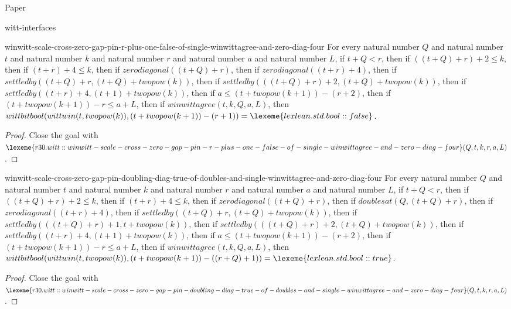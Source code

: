 \begin{lexlean}{Paper}
\begin{section}{witt-interfaces}
  \begin{theorem}{winwitt-scale-cross-zero-gap-pin-r-plus-one-false-of-single-winwittagree-and-zero-diag-four}
  For every natural number \(Q\) and natural number \(t\) and natural number \(k\) and natural number \(r\) and natural number \(a\) and natural number \(L\), if \(t + Q < r\), then if \(((t + Q) + r) + 2 ≤ k\), then if \((t + r) + 4 ≤ k\), then if \(zerodiagonal((t + Q) + r)\), then if \(zerodiagonal((t + r) + 4)\), then if \(settledby((t + Q) + r, (t + Q) + twopow(k))\), then if \(settledby(((t + Q) + r) + 2, (t + Q) + twopow(k))\), then if \(settledby((t + r) + 4, (t + 1) + twopow(k))\), then if \(a ≤ (t + twopow(k + 1)) - (r + 2)\), then if \((t + twopow(k + 1)) - r ≤ a + L\), then if \(winwittagree(t, k, Q, a, L)\), then \(wittbitbool(wittwin(t, twopow(k)), (t + twopow(k + 1)) - (r + 1)) = \lexeme{lexlean.std.bool::false}\).
  \begin{proof}
  Close the goal with \(\lexeme{r30.witt::winwitt-scale-cross-zero-gap-pin-r-plus-one-false-of-single-winwittagree-and-zero-diag-four}(Q, t, k, r, a, L)\).
  \end{proof}
  \end{theorem}

  \begin{theorem}{winwitt-scale-cross-zero-gap-pin-doubling-diag-true-of-doubles-and-single-winwittagree-and-zero-diag-four}
  For every natural number \(Q\) and natural number \(t\) and natural number \(k\) and natural number \(r\) and natural number \(a\) and natural number \(L\), if \(t + Q < r\), then if \(((t + Q) + r) + 2 ≤ k\), then if \((t + r) + 4 ≤ k\), then if \(zerodiagonal((t + Q) + r)\), then if \(doublesat(Q, (t + Q) + r)\), then if \(zerodiagonal((t + r) + 4)\), then if \(settledby((t + Q) + r, (t + Q) + twopow(k))\), then if \(settledby(((t + Q) + r) + 1, t + twopow(k))\), then if \(settledby(((t + Q) + r) + 2, (t + Q) + twopow(k))\), then if \(settledby((t + r) + 4, (t + 1) + twopow(k))\), then if \(a ≤ (t + twopow(k + 1)) - (r + 2)\), then if \((t + twopow(k + 1)) - r ≤ a + L\), then if \(winwittagree(t, k, Q, a, L)\), then \(wittbitbool(wittwin(t, twopow(k)), (t + twopow(k + 1)) - ((r + Q) + 1)) = \lexeme{lexlean.std.bool::true}\).
  \begin{proof}
  Close the goal with \(\lexeme{r30.witt::winwitt-scale-cross-zero-gap-pin-doubling-diag-true-of-doubles-and-single-winwittagree-and-zero-diag-four}(Q, t, k, r, a, L)\).
  \end{proof}
  \end{theorem}


\end{section}
\end{lexlean}
